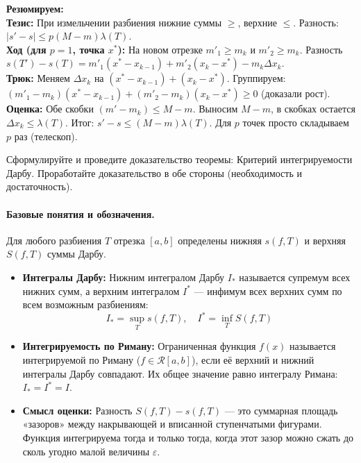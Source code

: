 \begin{tcolorbox}[colback=gray!5, colframe=black, boxrule=0.5pt, arc=0pt]
\textbf{Резюмируем:} \\
\textbf{Тезис:} При измельчении разбиения нижние суммы $\ge$, верхние $\le$. Разность: $|s' - s| \le p(M-m)\lambda(T)$. \\
\textbf{Ход (для $p=1$, точка $x^*$):} На новом отрезке $m'_1 \ge m_k$ и $m'_2 \ge m_k$. Разность $s(T') - s(T) = m'_1(x^* - x_{k-1}) + m'_2(x_k - x^*) - m_k\Delta x_k$. \\
\textbf{Трюк:} Меняем $\Delta x_k$ на $(x^* - x_{k-1}) + (x_k - x^*)$. Группируем: $(m'_1 - m_k)(x^* - x_{k-1}) + (m'_2 - m_k)(x_k - x^*) \ge 0$ (доказали рост). \\
\textbf{Оценка:} Обе скобки $(m' - m_k) \le M-m$. Выносим $M-m$, в скобках остается $\Delta x_k \le \lambda(T)$. Итог: $s' - s \le (M-m)\lambda(T)$. Для $p$ точек просто складываем $p$ раз (телескоп).
\end{tcolorbox}






{Сформулируйте и проведите доказательство теоремы: Критерий интегрируемости Дарбу. Проработайте доказательство в обе стороны (необходимость и достаточность).}

\paragraph{Базовые понятия и обозначения.}
Для любого разбиения $T$ отрезка $[a, b]$ определены нижняя $s(f, T)$ и верхняя $S(f, T)$ суммы Дарбу.
\begin{itemize}
    \item \textbf{Интегралы Дарбу:} Нижним интегралом Дарбу $I_*$ называется супремум всех нижних сумм, а верхним интегралом $I^*$ — инфимум всех верхних сумм по всем возможным разбиениям:
    $$ I_* = \sup_{T} s(f, T), \quad I^* = \inf_{T} S(f, T) $$
    \item \textbf{Интегрируемость по Риману:} Ограниченная функция $f(x)$ называется интегрируемой по Риману ($f \in \mathcal{R}[a,b]$), если её верхний и нижний интегралы Дарбу совпадают. Их общее значение равно интегралу Римана: $I_* = I^* = I$.
    \item \textbf{Смысл оценки:} Разность $S(f, T) - s(f, T)$ — это суммарная площадь «зазоров» между накрывающей и вписанной ступенчатыми фигурами. Функция интегрируема тогда и только тогда, когда этот зазор можно сжать до сколь угодно малой величины $\varepsilon$.
\end{itemize}

